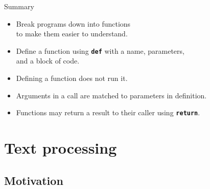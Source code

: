 \documentclass[aspectratio=169,usenames,dvipsnames]{beamer}
\begin{document}
\begin{frame}{Summary}
    \begin{itemize}
        \item Break programs down into functions \\
            to make them easier to understand.
        \item Define a function using \texttt{\textbf{\textcolor{OliveGreen}{def}}}
            with a name, parameters,\\ and a block of code.
        \item Defining a function does not run it.
        \item Arguments in a call are matched to parameters in definition.
        \item Functions may return a result to their caller using
            \texttt{\textbf{\textcolor{OliveGreen}{return}}}.
    \end{itemize}
\end{frame}





\section{Text processing}
\subsection{Motivation}
\frame{\tableofcontents[currentsection]}

\end{document}
